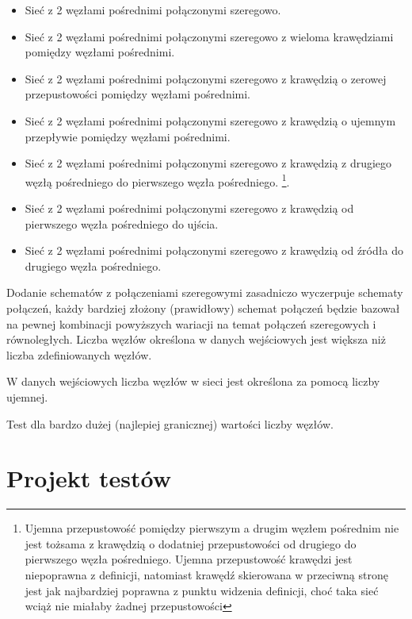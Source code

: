 \documentclass[10pt]{dokument-tiwo}
\begin{document}
\begin{itemize}
    \item Sieć z 2 węzłami pośrednimi połączonymi szeregowo.
    \item Sieć z 2 węzłami pośrednimi połączonymi szeregowo z wieloma krawędziami pomiędzy węzłami pośrednimi.
    \item Sieć z 2 węzłami pośrednimi połączonymi szeregowo z krawędzią o zerowej przepustowości pomiędzy węzłami pośrednimi.
    \item Sieć z 2 węzłami pośrednimi połączonymi szeregowo z krawędzią o ujemnym przepływie pomiędzy węzłami pośrednimi.
    \item Sieć z 2 węzłami pośrednimi połączonymi szeregowo z krawędzią z drugiego węzłą pośredniego do pierwszego węzła pośredniego.
\footnote{Ujemna przepustowość pomiędzy pierwszym a drugim węzłem pośrednim nie jest tożsama z krawędzią o dodatniej przepustowości od drugiego do pierwszego węzła pośredniego. Ujemna przepustowość krawędzi jest niepoprawna z definicji, natomiast krawędź skierowana w przeciwną stronę jest jak najbardziej poprawna z punktu widzenia definicji, choć taka sieć wciąż nie miałaby żadnej przepustowości}.
    \item Sieć z 2 węzłami pośrednimi połączonymi szeregowo z krawędzią od pierwszego węzła pośredniego do ujścia.
    \item Sieć z 2 węzłami pośrednimi połączonymi szeregowo z krawędzią od źródła do drugiego węzła pośredniego.
\end{itemize}
Dodanie schematów z połączeniami szeregowymi zasadniczo wyczerpuje schematy połączeń, każdy bardziej złożony (prawidłowy) schemat połączeń będzie bazował na pewnej kombinacji powyższych wariacji na temat połączeń szeregowych i równoległych.
Liczba węzłów określona w danych wejściowych jest większa niż liczba zdefiniowanych węzłów.

W danych wejściowych liczba węzłów w sieci jest określona za pomocą liczby ujemnej.

Test dla bardzo dużej (najlepiej granicznej) wartości liczby węzłów.


\section{Projekt testów}
\end{document}
